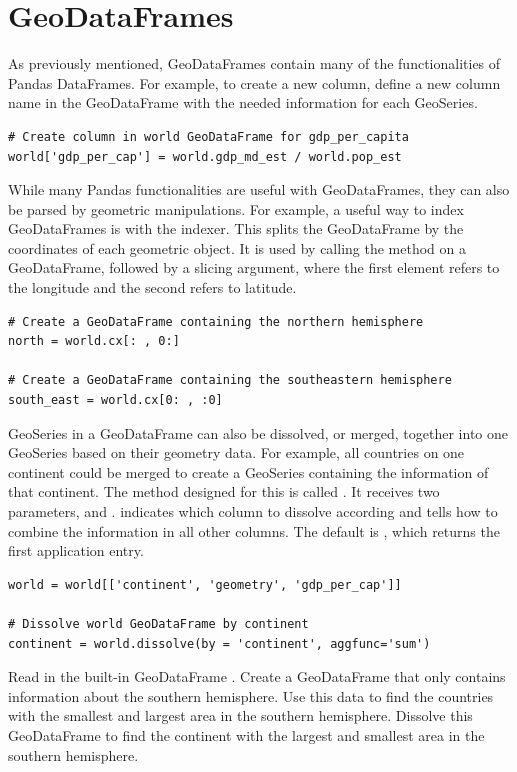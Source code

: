 \section*{GeoDataFrames}

As previously mentioned, GeoDataFrames contain many of the functionalities of Pandas DataFrames.
For example, to create a new column, define a new column name in the GeoDataFrame with the needed information for each GeoSeries.

\begin{lstlisting}
# Create column in world GeoDataFrame for gdp_per_capita
world['gdp_per_cap'] = world.gdp_md_est / world.pop_est
\end{lstlisting}

While many Pandas functionalities are useful with GeoDataFrames, they can also be parsed by geometric manipulations.
For example, a useful way to index GeoDataFrames is with the  indexer.
This splits the GeoDataFrame by the coordinates of each geometric object.
It is used by calling the method  on a GeoDataFrame, followed by a slicing argument, where the first element refers to the longitude and the second refers to latitude.

\begin{lstlisting}
# Create a GeoDataFrame containing the northern hemisphere
north = world.cx[: , 0:]

# Create a GeoDataFrame containing the southeastern hemisphere
south_east = world.cx[0: , :0]
\end{lstlisting}

GeoSeries in a GeoDataFrame can also be dissolved, or merged, together into one GeoSeries based on their geometry data.
For example, all countries on one continent could be merged to create a GeoSeries containing the information of that continent.
The method designed for this is called .
It receives two parameters,  and .
 indicates which column to dissolve according and  tells how to combine the information in all other columns.
The default  is , which returns the first application entry.

\begin{lstlisting}
world = world[['continent', 'geometry', 'gdp_per_cap']]

# Dissolve world GeoDataFrame by continent
continent = world.dissolve(by = 'continent', aggfunc='sum')
\end{lstlisting}

\begin{problem}
Read in the built-in GeoDataFrame .
Create a GeoDataFrame that only contains information about the southern hemisphere.
Use this data to find the countries with the smallest and largest area in the southern hemisphere.
Dissolve this GeoDataFrame to find the continent with the largest and smallest area in the southern hemisphere.
\end{problem}

